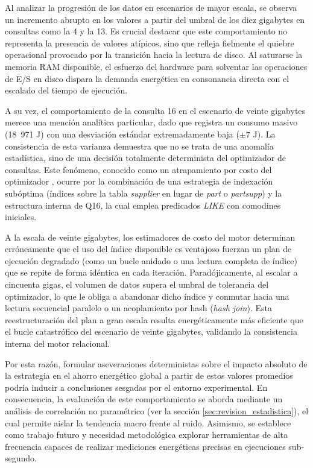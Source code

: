 \documentclass[12pt, letter paper]{report}
\begin{document}
        Al analizar la progresión de los datos en escenarios de mayor escala, se
        observa un incremento abrupto en los valores a partir del umbral de los
        diez gigabytes en consultas como la 4 y la 13. Es crucial destacar que
        este comportamiento no representa la presencia de valores atípicos, sino
        que refleja fielmente el quiebre operacional provocado por la transición
        hacia la lectura de disco. Al saturarse la memoria RAM disponible, el
        esfuerzo del hardware para solventar las operaciones de E/S en disco
        dispara la demanda energética en consonancia directa con el escalado del
        tiempo de ejecución.

        A su vez, el comportamiento de la consulta 16 en el escenario de veinte
        gigabytes merece una mención analítica particular, dado que registra un
        consumo masivo (18~971 J) con una desviación estándar extremadamente
        baja ($\pm 7$ J). La consistencia de esta varianza demuestra que no se
        trata de una anomalía estadística, sino de una decisión totalmente
        determinista del optimizador de consultas. Este fenómeno, conocido como
        un atrapamiento por costo del optimizador \cite{chaudhuri1998overview},
        ocurre por la combinación de una estrategia de indexación subóptima
        (índices sobre la tabla \textit{supplier} en lugar de \textit{part} o
        \textit{partsupp}) y la estructura interna de Q16, la cual emplea
        predicados \textit{LIKE} con comodines iniciales.

        A la escala de veinte gigabytes, los estimadores de costo del motor
        determinan erróneamente que el uso del índice disponible es ventajoso
        fuerzan un plan de ejecución degradado (como un bucle anidado o una
        lectura completa de índice) que se repite de forma idéntica en cada
        iteración. Paradójicamente, al escalar a cincuenta gigas, el volumen de
        datos supera el umbral de tolerancia del optimizador, lo que le obliga a
        abandonar dicho índice y conmutar hacia una lectura secuencial paralelo
        o un acoplamiento por hash (\textit{hash join}). Esta reestructuración
        del plan a gran escala resulta energéticamente más eficiente que el
        bucle catastrófico del escenario de veinte gigabytes, validando la
        consistencia interna del motor relacional.

        Por esta razón, formular aseveraciones deterministas sobre el impacto
        absoluto de la estrategia en el ahorro energético global a partir de
        estos valores promedios podría inducir a conclusiones sesgadas por el
        entorno experimental. En consecuencia, la evaluación de este
        comportamiento se aborda mediante un análisis de correlación no
        paramétrico (ver la sección \ref{sec:revision_estadistica}), el cual
        permite aislar la tendencia macro frente al ruido. Asimismo, se
        establece como trabajo futuro y necesidad metodológica explorar
        herramientas de alta frecuencia capaces de realizar mediciones
        energéticas precisas en ejecuciones sub-segundo.
\end{document}
